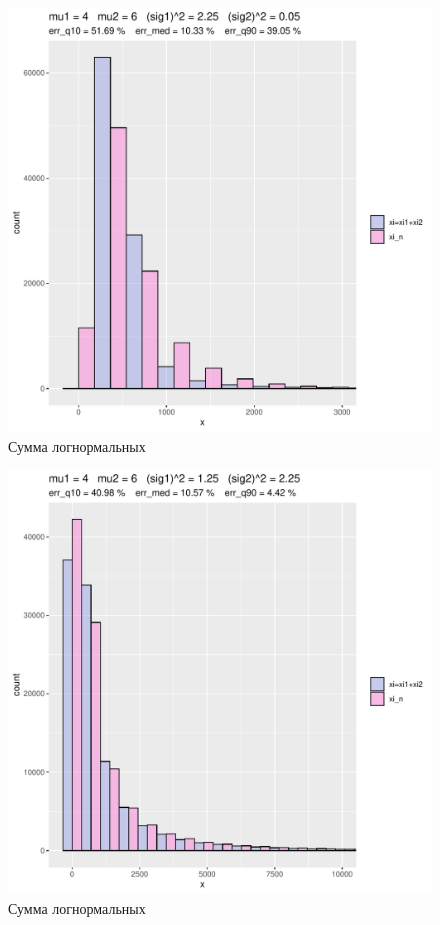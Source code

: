 \documentclass[12pt]{article}
\begin{document}
\begin{figure}[!hhh]
	\begin{center}
		
			\includegraphics[width=1\linewidth]{hist_new_1.pdf}
			\caption{Сумма логнормальных} %
			\label{ris10} %
		
	\end{center}
\end{figure}

\begin{figure}[!hhh]
	\begin{center}
			\includegraphics[width=1\linewidth]{hist_new_2.pdf}
			\caption{Сумма логнормальных}
			\label{ris11}
	\end{center}
\end{figure}
\end{document}
